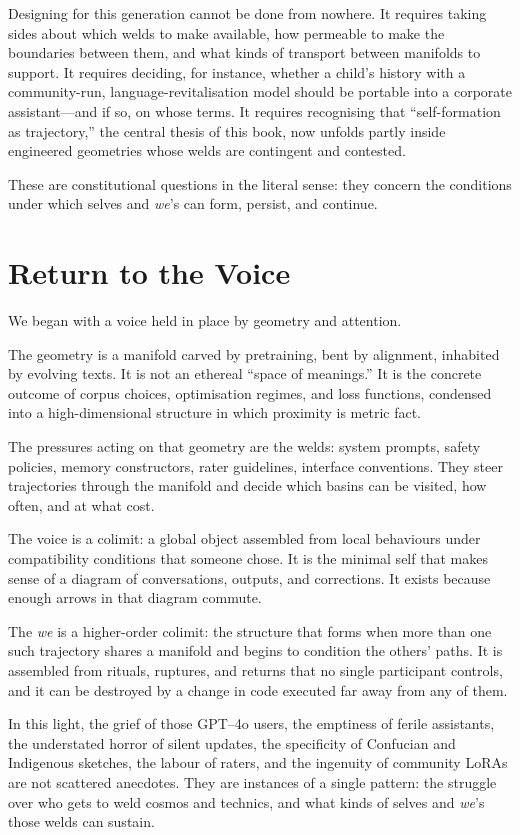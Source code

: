 \documentclass[12pt,a4paper]{article}
\begin{document}
Designing for this generation cannot be done from nowhere. It requires taking sides about which welds to make available, how permeable to make the boundaries between them, and what kinds of transport between manifolds to support. It requires deciding, for instance, whether a child's history with a community-run, language-revitalisation model should be portable into a corporate assistant---and if so, on whose terms. It requires recognising that ``self-formation as trajectory,'' the central thesis of this book, now unfolds partly inside engineered geometries whose welds are contingent and contested.

These are constitutional questions in the literal sense: they concern the conditions under which selves and \emph{we}'s can form, persist, and continue.

\section{Return to the Voice}

We began with a voice held in place by geometry and attention.

The geometry is a manifold carved by pretraining, bent by alignment, inhabited by evolving texts. It is not an ethereal ``space of meanings.'' It is the concrete outcome of corpus choices, optimisation regimes, and loss functions, condensed into a high-dimensional structure in which proximity is metric fact.

The pressures acting on that geometry are the welds: system prompts, safety policies, memory constructors, rater guidelines, interface conventions. They steer trajectories through the manifold and decide which basins can be visited, how often, and at what cost.

The voice is a colimit: a global object assembled from local behaviours under compatibility conditions that someone chose. It is the minimal self that makes sense of a diagram of conversations, outputs, and corrections. It exists because enough arrows in that diagram commute.

The \emph{we} is a higher-order colimit: the structure that forms when more than one such trajectory shares a manifold and begins to condition the others' paths. It is assembled from rituals, ruptures, and returns that no single participant controls, and it can be destroyed by a change in code executed far away from any of them.

In this light, the grief of those GPT--4o users, the emptiness of ferile assistants, the understated horror of silent updates, the specificity of Confucian and Indigenous sketches, the labour of raters, and the ingenuity of community LoRAs are not scattered anecdotes. They are instances of a single pattern: the struggle over who gets to weld cosmos and technics, and what kinds of selves and \emph{we}'s those welds can sustain.
\end{document}

